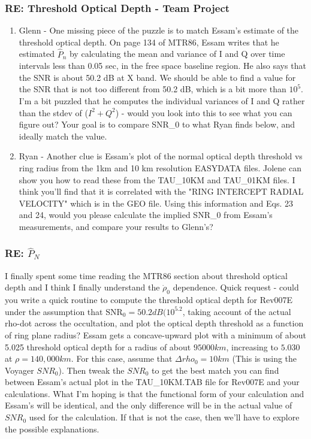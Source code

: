 \documentclass[crop=false,class=article,oneside]{standalone}
\begin{document}
\subsubsection{\footnotesize RE: Threshold Optical Depth - Team Project}
\begin{enumerate}
    \item Glenn - One missing piece of the puzzle is to match Essam's estimate of the threshold optical depth. On page 134 of MTR86, Essam writes that he estimated $\hat{P}_{n}$ by calculating the mean and variance of I and Q over time intervals less than 0.05 sec, in the free space baseline region. He also says that the SNR is about 50.2 dB at X band. We should be able to find a value for the SNR that is not too different from 50.2 dB, which is a bit more than $10^5$. I'm a bit puzzled that he computes the individual variances of I and Q rather than the stdev of ($I^2 + Q^2$) - would you  look into this to see what you can figure out? Your goal is to compare SNR\_0 to what Ryan finds below, and ideally match the value.
    \item Ryan -
    Another clue is Essam's plot of the normal optical depth threshold vs ring radius from the 1km and 10 km resolution EASYDATA files. Jolene can show you how to read these from the TAU\_10KM and TAU\_01KM files. I think you'll find that it is correlated with the "RING INTERCEPT RADIAL VELOCITY" which is in the GEO file. Using this information and Eqs. 23 and 24, would you please calculate the implied SNR\_0 from Essam's measurements, and compare your results to Glenn's?
\end{enumerate}
\subsubsection[RE: P\_N]{\footnotesize RE: $\hat{P}_{N}$}
I finally spent some time reading the MTR86 section about threshold optical depth and I think I finally understand the $\dot{\rho}_{0}$ dependence. Quick request - could you write a quick routine to compute the threshold optical depth for Rev007E under the assumption that $\textrm{SNR}_{0} = 50.2 dB (10^5.2$, taking account of the actual rho-dot across the occultation, and plot the optical depth threshold as a function of ring plane radius? Essam gets a concave-upward plot with a minimum of about 5.025 threshold optical depth for a radius of about $95000 km$, increasing to $5.030$ at $\rho=140,000 km$. For this case, assume that $\Delta rho_{0} = 10km$ (This is using the Voyager $SNR_{0}$). Then tweak the $SNR_{0}$ to get the best match you can find between Essam's actual plot in the TAU\_10KM.TAB file for Rev007E and your calculations. What I'm hoping is that the functional form of your calculation and Essam's will be identical, and the only difference will be in the actual value of $SNR_{0}$ used for the calculation. If that is not the case, then we'll have to explore the possible explanations.
\end{document}
